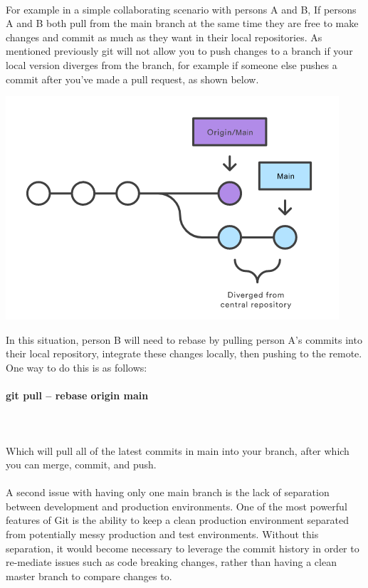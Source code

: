 \documentclass{article}
\begin{document}
\paragraph{}
For example in a simple collaborating scenario with persons A and B, If persons A and B both pull from the main branch at the same time they are free to make changes and commit as much as they want in their local repositories. 
\label{workflows} As mentioned previously git will not allow you to push changes to a branch if your local version diverges from the branch, for example if someone else pushes a commit after you've made a pull request, as shown below. 
\begin{center}
\includegraphics[width=.7\textwidth]{diverge}
\end{center}
In this situation, person B will need to rebase by pulling person A's commits into their local repository, integrate these changes locally, then pushing to the remote. One way to do this is as follows:

\paragraph{git pull -- rebase origin main} \mbox{}\\ \\
Which will pull all of the latest commits in main into your branch, after which you can merge, commit, and push. 
\\ \\
A second issue with having only one main branch is the lack of separation between development and production environments. One of the most powerful features of Git is the ability to keep a clean production environment separated from potentially messy production and test environments. Without this separation, it would become necessary to leverage the commit history in order to re-mediate issues such as code breaking changes, rather than having a clean master branch to compare changes to.
\end{document}
